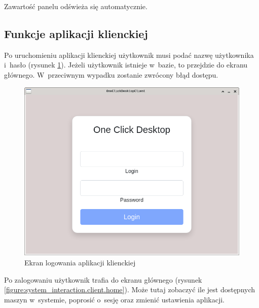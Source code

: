 \documentclass[../opis-rozwiazania.tex]{subfiles}
\begin{document}
Zawartość panelu odświeża się automatycznie.

\newpage
\subsection{Funkcje aplikacji klienckiej}

Po uruchomieniu aplikacji klienckiej użytkownik musi podać nazwę użytkownika i~hasło (rysunek \ref{figure:system_interaction.client.login}).
Jeżeli użytkownik istnieje w~bazie, to przejdzie do ekranu głównego.
W~przeciwnym wypadku zostanie zwrócony błąd dostępu.

\begin{figure}[ht!]
  \centering
  \includegraphics[width=\textwidth]{resources/client_login.png}
  \caption{Ekran logowania aplikacji klienckiej}
  \label{figure:system_interaction.client.login}
\end{figure}

Po zalogowaniu użytkownik trafia do ekranu głównego (rysunek \ref{figure:system_interaction.client.home}).
Może tutaj zobaczyć ile jest dostępnych maszyn w~systemie, poprosić o~sesję oraz zmienić ustawienia aplikacji.
\end{document}
